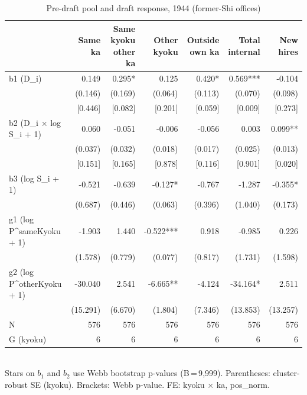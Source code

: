 \begin{table}[!htbp]
  \centering
  \caption{Pre-draft pool and draft response, 1944 (former-Shi offices)}
  \label{tab:predraft_v4}
  \begin{tabular}{lrrrrrr}
    \hline\hline
     & Same ka & Same kyoku other ka & Other kyoku & Outside own ka & Total internal & New hires \\
    \hline
    b1 (D_i) & 0.149 & 0.295* & 0.125 & 0.420* & 0.569*** & -0.104 \\
     & (0.146) & (0.169) & (0.064) & (0.113) & (0.070) & (0.098) \\
    [Webb p] & [0.446] & [0.082] & [0.201] & [0.059] & [0.009] & [0.273] \\
    b2 (D_i × log S_i + 1) & 0.060 & -0.051 & -0.006 & -0.056 & 0.003 & 0.099** \\
     & (0.037) & (0.032) & (0.018) & (0.017) & (0.025) & (0.013) \\
    [Webb p] & [0.151] & [0.165] & [0.878] & [0.116] & [0.901] & [0.020] \\
    b3 (log S_i + 1) & -0.521 & -0.639 & -0.127* & -0.767 & -1.287 & -0.355* \\
     & (0.687) & (0.446) & (0.063) & (0.396) & (1.040) & (0.173) \\
    g1 (log P^{sameKyoku} + 1) & -1.903 & 1.440 & -0.522*** & 0.918 & -0.985 & 0.226 \\
     & (1.578) & (0.779) & (0.077) & (0.817) & (1.731) & (1.598) \\
    g2 (log P^{otherKyoku} + 1) & -30.040 & 2.541 & -6.665** & -4.124 & -34.164* & 2.511 \\
     & (15.291) & (6.670) & (1.804) & (7.346) & (13.853) & (13.257) \\
    \hline
    N & 576 & 576 & 576 & 576 & 576 & 576 \\
    G (kyoku) & 6 & 6 & 6 & 6 & 6 & 6 \\
    \hline\hline
  \end{tabular}
  \\[4pt]
  \footnotesize Stars on \(b_1\) and \(b_2\) use Webb bootstrap p-values (B\,=\,9{,}999).
  Parentheses: cluster-robust SE (kyoku).
  Brackets: Webb p-value.
  FE: kyoku $\times$ ka, pos\_norm.
\end{table}
